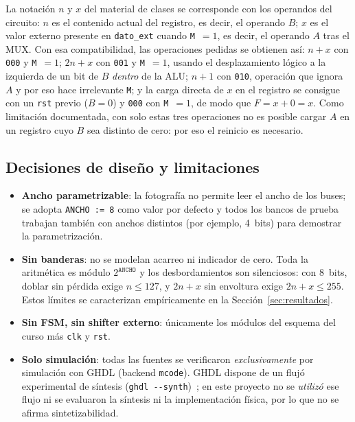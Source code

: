 \documentclass[llncs]{llncs}
\begin{document}
La notación $n$ y $x$ del material de clases se corresponde con los
operandos del circuito: $n$ es el contenido actual del registro, es decir,
el operando $B$; $x$ es el valor externo presente en \texttt{dato\_ext}
cuando \texttt{M}~$=1$, es decir, el operando $A$ tras el MUX. Con esa
compatibilidad, las operaciones pedidas se obtienen así: $n+x$ con
\texttt{000} y \texttt{M}~$=1$; $2n+x$ con \texttt{001} y
\texttt{M}~$=1$, usando el desplazamiento lógico a la izquierda de un bit
de $B$ \emph{dentro} de la ALU; $n+1$ con \texttt{010}, operación que
ignora $A$ y por eso hace irrelevante \texttt{M}; y la carga directa de
$x$ en el registro se consigue con un \texttt{rst} previo ($B=0$) y
\texttt{000} con \texttt{M}~$=1$, de modo que $F=x+0=x$. Como limitación
documentada, con solo estas tres operaciones no es posible cargar $A$ en
un registro cuyo $B$ sea distinto de cero: por eso el reinicio es
necesario.

\subsection{Decisiones de diseño y limitaciones}
\label{sec:decisiones}

\begin{itemize}
  \item \textbf{Ancho parametrizable}: la fotografía no permite leer el
    ancho de los buses; se adopta \texttt{ANCHO := 8} como valor por
    defecto y todos los bancos de prueba trabajan también con anchos
    distintos (por ejemplo, 4~bits) para demostrar la parametrización.
  \item \textbf{Sin banderas}: no se modelan acarreo ni indicador de
    cero. Toda la aritmética es módulo $2^{\texttt{ANCHO}}$ y los
    desbordamientos son silenciosos: con 8~bits, doblar sin pérdida
    exige $n \le 127$, y $2n+x$ sin envoltura exige $2n+x \le 255$.
    Estos límites se caracterizan empíricamente en la
    Sección~\ref{sec:resultados}.
  \item \textbf{Sin FSM, sin shifter externo}: únicamente los módulos del
    esquema del curso más \texttt{clk} y \texttt{rst}.
  \item \textbf{Solo simulación}: todas las fuentes se verificaron
    \emph{exclusivamente} por simulación con GHDL (backend \texttt{mcode}).
    GHDL dispone de un flujó experimental de síntesis
    (\texttt{ghdl {-}{-}synth})~\cite{ghdl-docs}; en este proyecto no se
    \emph{utilizó} ese flujo ni se evaluaron la síntesis ni la
    implementación física, por lo que no se afirma sintetizabilidad.
\end{itemize}
\end{document}
